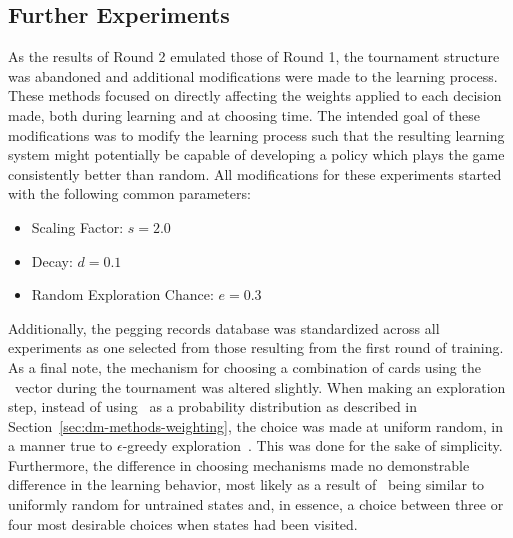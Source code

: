 

\subsection{Further Experiments}
\label{sec:findings-expts}

As the results of Round 2 emulated those of Round 1,
the tournament structure was abandoned and
additional modifications were made to the learning process.
%
These methods focused on directly affecting the weights applied to each
decision made,
both during learning and at choosing time.
%
The intended goal of these modifications was to modify the learning process
such that the resulting learning system might potentially be
capable of developing a policy which plays the game consistently better than
random.
%
All modifications for these experiments started with the following common
parameters:
\begin{itemize}
	\item Scaling Factor: $s = 2.0$
	\item Decay: $d = 0.1$
	\item Random Exploration Chance: $e = 0.3$
\end{itemize}
%
Additionally,
the pegging records database was standardized across all experiments
as one selected from those resulting from the first round of training.
%
As a final note,
the mechanism for choosing a combination of cards using the \pvec\ vector 
during the tournament was altered slightly.
%
When making an exploration step,
instead of using \pvec\ as a probability distribution
as described in Section~\ref{sec:dm-methods-weighting},
the choice was made at uniform random,
in a manner true to $\epsilon$-greedy exploration~\cite{rl_book}.
%
This was done for the sake of simplicity.
%
Furthermore,
the difference in choosing mechanisms
made no demonstrable difference in the learning behavior,
most likely as a result of \pvec\ being similar to uniformly random
for untrained states
and, in essence, a choice between three or four most desirable choices when
states had been visited.

%












